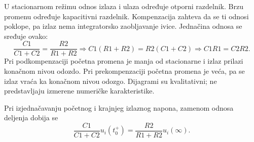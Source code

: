 U stacionarnom režimu odnos izlaza i ulaza određuje otporni razdelnik. Brzu promenu određuje kapacitivni razdelnik. Kompenzacija zahteva da se ti odnosi poklope, pa izlaz nema integratorsko zaobljavanje ivice. Jednačina odnosa se sređuje ovako:
\[\frac{C1}{C1+C2}=\frac{R2}{R1+R2}\Rightarrow C1(R1+R2)=R2(C1+C2)\Rightarrow C1R1=C2R2.\]
Pri podkompenzaciji početna promena je manja od stacionarne i izlaz prilazi konačnom nivou odozdo. Pri prekompenzaciji početna promena je veća, pa se izlaz vraća ka konačnom nivou odozgo. Dijagrami su kvalitativni; ne predstavljaju izmerene numeričke karakteristike.

Pri izjednačavanju početnog i krajnjeg izlaznog napona, zamenom odnosa deljenja dobija se
\[\frac{C1}{C1+C2}u_i(t_0^+)=\frac{R2}{R1+R2}u_i(\infty).\]
